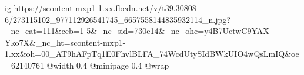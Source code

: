  
 
 
 
 

\ifcmt
  ig https://scontent-mxp1-1.xx.fbcdn.net/v/t39.30808-6/273115102_977112926541745_6657558144835932114_n.jpg?_nc_cat=111&ccb=1-5&_nc_sid=730e14&_nc_ohc=y4B7UctwC9YAX-Yko7X&_nc_ht=scontent-mxp1-1.xx&oh=00_AT9hAFpTq1E0FhvlBLFA_74WcdUtySIdBWkUIO4wQsLmIQ&oe=62140761
  @width 0.4
  @minipage 0.4
  @wrap \parpic[r]
\fi
